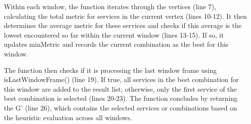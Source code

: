   Within each window, the function iterates through the vertices (line 7), calculating the total metric for services in the current vertex (lines 10-12). It then determines the average metric for these services and checks if this average is the lowest encountered so far within the current window (lines 13-15). If so, it updates minMetric and records the current combination as the best for this window.

  The function then checks if it is processing the last window frame using isLastWindowFrame() (line 19). If true, all services in the best combination for this window are added to the result list; otherwise, only the first service of the best combination is selected (lines 20-23). The function concludes by returning the  $\text{G'}$ (line 26), which contains the selected services or combinations based on the heuristic evaluation across all windows.
